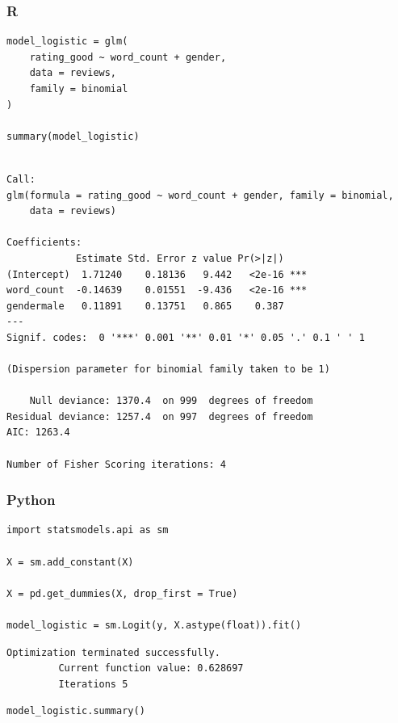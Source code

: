 \documentclass[
  letterpaper,
]{krantz}
\begin{document}
\subsubsection{R}

\begin{verbatim}
model_logistic = glm(
    rating_good ~ word_count + gender, 
    data = reviews,
    family = binomial
)

summary(model_logistic)
\end{verbatim}

\begin{verbatim}

Call:
glm(formula = rating_good ~ word_count + gender, family = binomial, 
    data = reviews)

Coefficients:
            Estimate Std. Error z value Pr(>|z|)    
(Intercept)  1.71240    0.18136   9.442   <2e-16 ***
word_count  -0.14639    0.01551  -9.436   <2e-16 ***
gendermale   0.11891    0.13751   0.865    0.387    
---
Signif. codes:  0 '***' 0.001 '**' 0.01 '*' 0.05 '.' 0.1 ' ' 1

(Dispersion parameter for binomial family taken to be 1)

    Null deviance: 1370.4  on 999  degrees of freedom
Residual deviance: 1257.4  on 997  degrees of freedom
AIC: 1263.4

Number of Fisher Scoring iterations: 4
\end{verbatim}

\subsubsection{Python}

\begin{verbatim}
import statsmodels.api as sm

X = sm.add_constant(X)

X = pd.get_dummies(X, drop_first = True)

model_logistic = sm.Logit(y, X.astype(float)).fit()
\end{verbatim}

\begin{verbatim}
Optimization terminated successfully.
         Current function value: 0.628697
         Iterations 5
\end{verbatim}

\begin{verbatim}
model_logistic.summary()
\end{verbatim}
\end{document}
